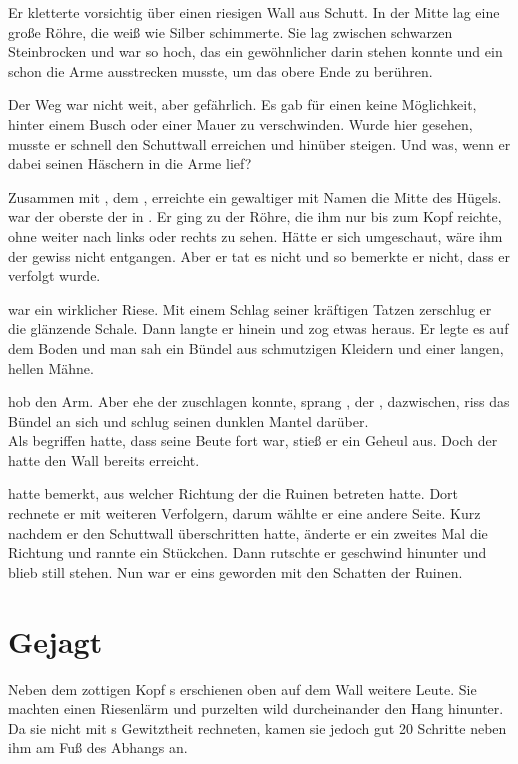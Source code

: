\begin{huge}
Er kletterte vorsichtig über einen riesigen Wall aus Schutt. In der Mitte lag eine große Röhre, die weiß wie Silber schimmerte. Sie lag zwischen schwarzen Steinbrocken und war so hoch, das ein gewöhnlicher \Bangiri darin stehen konnte und ein {\Enlaender} schon die Arme ausstrecken musste, um das obere Ende zu berühren. 

Der Weg war nicht weit, aber gefährlich. Es gab für einen {\Schattenlaufer} keine Möglichkeit, hinter einem Busch oder einer Mauer zu verschwinden. Wurde {\Eno} hier gesehen, musste er schnell den Schuttwall erreichen und hinüber steigen. Und was, wenn er dabei seinen Häschern in die Arme lief?

Zusammen mit {\Eno}, dem {\Schattenlaufer}, erreichte ein gewaltiger {\Bangiri} mit Namen {\Pato} die Mitte des Hügels. {\Pato} war der oberste der {\Bangiri} in {\Tern}. Er ging zu der Röhre, die ihm nur bis zum Kopf reichte, ohne weiter nach links oder rechts zu sehen. Hätte er sich umgeschaut, wäre ihm der {\Schattenlaufer} gewiss nicht entgangen. Aber er tat es nicht und so bemerkte er nicht, dass er verfolgt wurde.

{\Pato} war ein wirklicher Riese. Mit einem Schlag seiner kräftigen Tatzen zerschlug er die glänzende Schale. Dann langte er hinein und zog etwas heraus. Er legte es auf dem Boden und man sah ein Bündel aus schmutzigen Kleidern und einer langen, hellen Mähne. 

{\Pato} hob den Arm. Aber ehe der {\Bangiri} zuschlagen konnte, sprang {\Eno}, der {\Schattenjager}, dazwischen, riss das Bündel an sich und schlug seinen dunklen Mantel darüber.\\
Als {\Pato} begriffen hatte, dass seine Beute fort war, stieß er ein Geheul aus. Doch der {\Schattenjager} hatte den Wall bereits erreicht.

{\Eno} hatte bemerkt, aus welcher Richtung der {\Bangiri} die Ruinen betreten hatte. Dort rechnete er mit weiteren Verfolgern, darum wählte er eine andere Seite. Kurz nachdem er den Schuttwall überschritten hatte, änderte er ein zweites Mal die Richtung und rannte ein Stückchen. Dann rutschte er geschwind hinunter und blieb still stehen. Nun war er eins geworden mit den Schatten der Ruinen.

\section{Gejagt}
Neben dem zottigen Kopf {\Pato}s erschienen oben auf dem Wall weitere Leute. Sie machten einen Riesenlärm und purzelten wild durcheinander den Hang hinunter. Da sie nicht mit {\Eno}s Gewitztheit rechneten, kamen sie jedoch gut 20 Schritte neben ihm am Fuß des Abhangs an.


\end{huge}
